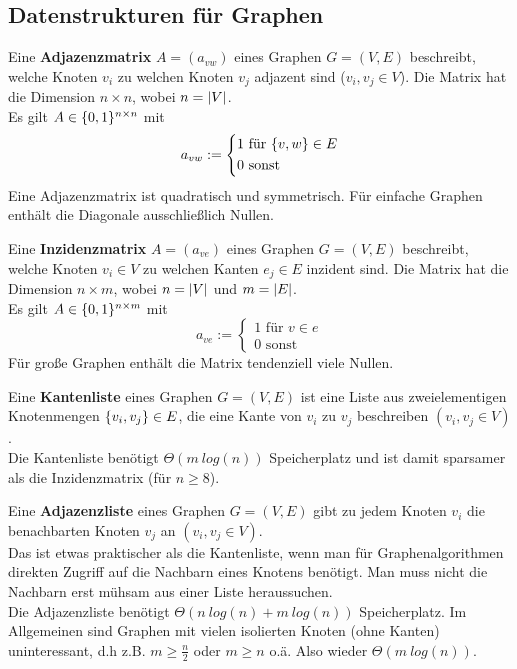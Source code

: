 	\subsection{Datenstrukturen für Graphen}
	\begin{definition*}[Adjazenzmatrix]
		Eine \textbf{Adjazenzmatrix} $A = (a_{vw})$ eines Graphen $G = (V, E)$ beschreibt, welche Knoten $v_i$ zu welchen Knoten $v_j$ adjazent sind ($v_i, v_j \in V$). Die Matrix hat die Dimension $n\times n$, wobei $n = \vert V \vert$.\\
		Es gilt $A\in \{0, 1\}^{n\times n}$ mit
		\begin{equation*}
			a_{vw} := \begin{cases*}
				1 \text{ für } \set{v,w} \in E\\
				0 \text{ sonst}
			\end{cases*}
		\end{equation*}
		Eine Adjazenzmatrix ist quadratisch und symmetrisch. Für einfache Graphen enthält die Diagonale ausschließlich Nullen.\\
	\end{definition*}
	\begin{definition*}[Inzidenzmatrix]
		Eine \textbf{Inzidenzmatrix} $A = (a_{ve})$ eines Graphen $G = (V, E)$ beschreibt, welche Knoten $v_i \in V$ zu welchen Kanten $e_j \in E$ inzident sind. Die Matrix hat die Dimension $n\times m$, wobei $n = \vert V \vert$ und $m = \vert E \vert$.\\
		Es gilt $A\in \{0, 1\}^{n\times m}$ mit
		\begin{equation*}
			a_{ve} := \begin{cases*}
			1 \text{ für } v \in e\\
			0 \text{ sonst}
			\end{cases*}
		\end{equation*}
		Für große Graphen enthält die Matrix tendenziell viele Nullen.
	\end{definition*}
	\begin{definition*}[Kantenliste]
		Eine \textbf{Kantenliste} eines Graphen $G = (V, E)$ ist eine Liste aus zweielementigen Knotenmengen $\{v_i, v_j\} \in E$, die eine Kante von $v_i$ zu $v_j$ beschreiben $(v_i, v_j \in V)$.\\ Die Kantenliste benötigt $\Theta(m~log(n))$ Speicherplatz und ist damit sparsamer als die Inzidenzmatrix (für $n \ge 8$).
	\end{definition*}
	\begin{definition*}[Adjazenzliste]
		Eine \textbf{Adjazenzliste} eines Graphen $G = (V, E)$ gibt zu jedem Knoten $v_i$ die benachbarten Knoten $v_j$ an $(v_i, v_j \in V)$.\\
		Das ist etwas praktischer als die Kantenliste, wenn man für Graphenalgorithmen direkten Zugriff auf die Nachbarn eines Knotens benötigt. Man muss nicht die Nachbarn erst mühsam aus einer Liste heraussuchen.\\
		Die Adjazenzliste benötigt $\Theta(n~log(n)+m~log(n))$ Speicherplatz. Im Allgemeinen sind Graphen mit vielen isolierten Knoten (ohne Kanten) uninteressant, d.h z.B. $m\ge \frac{n}{2}$ oder $m\ge n$ o.ä. Also wieder $\Theta(m~log(n))$.
	\end{definition*}
	
